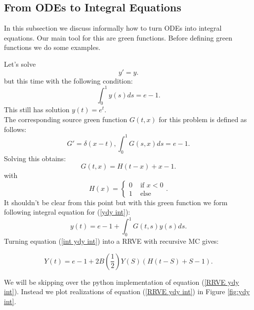 \documentclass[a4paper,12pt]{article}
\begin{document}
\subsection{From ODEs to Integral Equations}
In this subsection we discuss informally how to turn ODEs into integral equations.
Our main tool for this are green functions. Before defining green functions
we do some examples.  \\

\begin{example}[$y'=y$]
    Let's solve
    \begin{equation} \label{ydy int}
        y'=y.
    \end{equation}
    but this time with the following condition:
    \[
        \int_{0}^{1} y(s) ds = e-1
        .\]
    This still has solution $y(t)=e^{t}$. \\
    The corresponding source
    green function $G(t,x)$ for this problem is defined as follows:
    \[
        G'= \delta(x-t), \int_{0}^{1}G(s,x)ds = e -1
        .\]
    Solving this obtains:
    \[
        G(t,x) = H(t-x) +x-1
        .\]
    with
    \[
        H(x) = \begin{cases}
            0 & \text{ if } x<0 \\
            1 & \text{ else }
        \end{cases}
        .\]
    It shouldn't be clear from this point but with this green
    function we form following integral equation for (\ref{ydy int}):
    \begin{equation} \label{int ydy int}
        y(t)= e -1 + \int_{0}^{1}G(t,s)y(s)ds.
    \end{equation}
    Turning equation (\ref{int ydy int}) into a RRVE with recursive MC gives:

    \begin{equation}\label{RRVE ydy int}
        Y(t)= e-1 + 2B\left(\frac{1}{2} \right)Y(S)(H(t-S)+S-1) .
    \end{equation}

    We will be skipping over the python implementation of equation (\ref{RRVE ydy int}).
    Instead we plot realizations of equation (\ref{RRVE ydy int}) in Figure \ref{fig:ydy int}.


\end{example}
\end{document}
